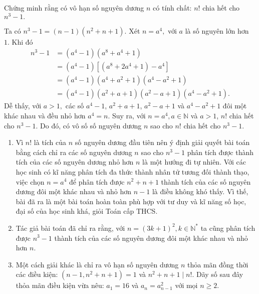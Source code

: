 \begin{bt}%
	Chứng minh rằng có vô hạn số nguyên dương $n$ có tính chất: $n!$ chia hết cho $n^3-1.$
	\loigiai
	{Ta có $n^3-1=(n-1)(n^2+n+1).$
		Xét $n=a^4,$ với $a$ là số nguyên lớn hơn $1.$
		Khi đó 
		{\allowdisplaybreaks
	\begin{align*}
		n^3-1&=(a^4-1)(a^8+a^4+1)\\
		&=(a^4-1)\left[(a^8+2a^4+1)-a^4\right]\\
		&=(a^4-1)(a^4+a^2+1)(a^4-a^2+1)\\
		&=(a^4-1)(a^2+a+1)(a^2-a+1)(a^4-a^2+1).
		\end{align*}}Dễ thấy, với $a>1,$ các số $a^4-1$, $a^2+a+1$, $a^2-a+1$ và $a^4-a^2+1$ đôi một khác nhau và đều nhỏ hơn $a^4=n.$
		Suy ra, với $n=a^4, a \in \mathbb{N}$ và $a>1$, $n!$ chia hết cho $n^3-1.$
		Do đó, có vô số số nguyên dương $n$ sao cho $n!$ chia hết cho $n^3-1.$
		\begin{nx}\quad
			\begin{enumerate}[1.]
				\item Vì $n!$ là tích của $n$ số nguyên dương đầu tiên nên ý định giải quyết bài toán bằng cách chỉ ra các số nguyên dương $n$ sao cho $n^3-1$ phân tích được thành tích của các số nguyên dương nhỏ hơn $n$ là một hướng đi tự nhiên. Với các học sinh có kĩ năng phân tích đa thức thành nhân tử tương đối thành thạo, việc chọn $n=a^4$ để phân tích được $n^2+n+1$ thành tích của các số nguyên dương đôi một khác nhau và nhỏ hơn $n-1$ là điều không khó thấy. Vì thế, bài đã ra là một bài toán hoàn toàn phù hợp với tư duy và kĩ năng số học, đại số của học sinh khá, giỏi Toán cấp THCS. 
				\item Tác giả bài toán đã chỉ ra rằng, với $n=(3k+1)^2, k\in \mathbb{N}^*$ ta cũng phân tích được $n^3-1$ thành tích của các số nguyên dương đôi một khác nhau và nhỏ hơn $n.$
				\item Một cách giải khác là chỉ ra vô hạn số nguyên dương $n$ thỏa mãn đồng thời các điều kiện: $(n-1, n^2+n+1)=1$ và $n^2+n+1\mid n!.$ Dãy số sau đây thỏa mãn điều kiện vừa nêu: $a_1=16$ và $a_n=a_{n-1}^2$ với mọi $n\geq 2.$
			\end{enumerate}
		\end{nx}}
\end{bt}
